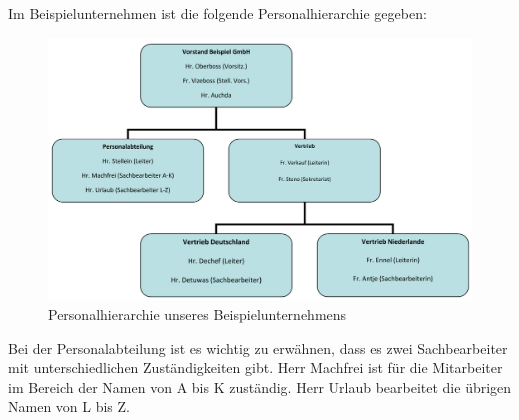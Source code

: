 Im Beispielunternehmen ist die folgende Personalhierarchie gegeben:
\begin{figure}[H]
\centering
\includegraphics[width=1.0\linewidth]{Bilder/Hierarchie}
\caption[]{Personalhierarchie unseres Beispielunternehmens\footnotemark}
\label{fig:Hierarchie}
\end{figure}

Bei der Personalabteilung ist es wichtig zu erwähnen, dass es zwei Sachbearbeiter mit unterschiedlichen Zuständigkeiten gibt. Herr Machfrei ist für die Mitarbeiter im Bereich der Namen von A bis K zuständig. Herr Urlaub bearbeitet die übrigen Namen von L bis Z.
